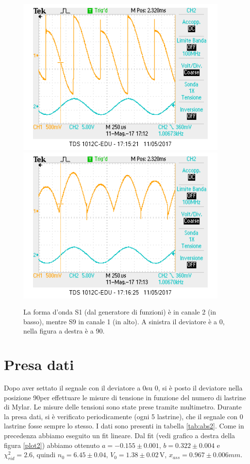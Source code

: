 \documentclass[10pt,a4paper]{article}
\begin{document}
\begin{figure}[!htb]
  \centering
  \includegraphics[scale=0.45]{dev0ch1S9-ch2S1(zero).png}\includegraphics[scale=0.45]{dev90ch1S9-ch2S1(zero).png}
\caption{La forma d'onda S1 (dal generatore di funzioni) è in canale 2 (in basso), mentre S9 in canale 1 (in alto). A sinistra il deviatore è a 0\degree, nella figura a destra è a 90\degree. \label{osc:devS9}}
\end{figure}

\section{Presa dati}
Dopo aver settato il segnale con il deviatore a 0\degree su 0, si è posto il deviatore nella posizione 90\degree per effettuare le misure di tensione in funzione del numero di lastrine di Mylar.
Le misure delle tensioni sono state prese tramite multimetro. Durante la presa dati, si è verificato periodicamente (ogni 5 lastrine), che il segnale con 0 lastrine fosse sempre lo stesso. I dati sono presenti in tabella \ref{tab:abs2}. Come in precedenza abbiamo eseguito un fit lineare.
Dal fit (vedi grafico a destra della figura \ref{plot2}) abbiamo ottenuto $a=-0.155\pm0.001$, $b=0.322\pm0.004$ e $\chi^2_{rid}=2.6$, quindi $n_0= 6.45\pm 0.04$, $V_0=1.38\pm0.02\,\mbox{V}$, $x_{ass}=0.967\pm0.006{mm}$.
\end{document}
